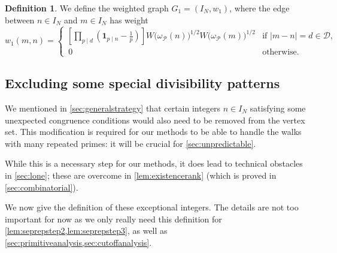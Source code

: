 \documentclass[11pt]{amsart}
\theoremstyle{definition}
\newtheorem{definition}[theorem]{Definition}
\newcommand{\ind}[1]{\mathbf{1}_{#1}}
\newcommand{\N}{I_N}
\newcommand{\primes}{\mathcal{P}}
\newcommand{\D}{\mathcal{D}}
\newcommand{\graph}{G}
\begin{document}
\begin{definition}
\label{def:Gamma1}
We define the weighted graph $\graph_1 = (\N, w_1)$, where the edge between $n\in \N$ and $m\in \N$ has weight 
\begin{equation*}
w_1(m,n) = \begin{cases}
\left[\prod_{p\mid d} \left(\ind{p\mid n}-\frac {1}{p}\right) \right] W\big(\omega_{\primes}(n)\big)^{1/2}W\big(\omega_{\primes}(m)\big)^{1/2} &\text{if }|m-n| = d\in \D,\\
\, {0} & \text{otherwise.}
\end{cases}
\end{equation*}

\end{definition}
 



\subsection{Excluding some special divisibility patterns}
\label{sec:Y}
We mentioned in \cref{sec:generalstrategy} that certain integers $n\in \N$ satisfying some unexpected congruence conditions would also need to be removed from the vertex set. This modification is required for our methods to be able to handle the walks with many repeated primes: it will be crucial for \cref{sec:unpredictable}.

While this is a necessary step for our methods, it does lead to technical obstacles in \cref{sec:lone}; these are overcome in \cref{lem:existencerank} (which is proved in \cref{sec:combinatorial}).

We now give the definition of these exceptional integers. The details are not too important for now as we only really need this definition for \cref{lem:seprepstep2,lem:seprepstep3}, as well as \cref{sec:primitiveanalysis,sec:cutoffanalysis}.
\end{document}
